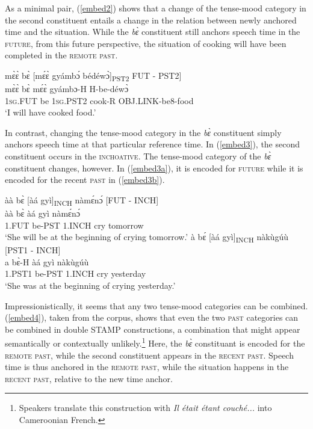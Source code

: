 \noindent As a minimal pair, (\ref{embed2}) shows that a change of the tense-mood category in the second constituent entails a change in the relation between newly anchored time and the situation. While the {\itshape bɛ̀} constituent still anchors speech time in the \textsc{future}, from this future perspective, the situation of cooking will have been completed in the \textsc{remote past}.

\begin{exe} 
\ex\label{embed2}
  \glll mɛ̀ɛ̀ bɛ̀ [mɛ́ɛ̀ gyámbɔ́ bédéwɔ̀]\textsubscript{PST2} \hfill FUT - PST2]\\
        mɛ̀ɛ̀ bɛ̀ mɛ́ɛ̀ gyámbɔ-H H-be-déwɔ̀ \\
        1\textsc{sg}.FUT be 1\textsc{sg}.PST2 cook-R OBJ.LINK-be8-food \\
    \trans `I will have cooked food.'
\end{exe}

In contrast, changing the tense-mood category in the {\itshape bɛ̀} constituent simply anchors speech time at that particular reference time. In (\ref{embed3}), the second constituent occurs in the \textsc{inchoative}. The tense-mood category of the {\itshape bɛ̀} constituent changes, however. In (\ref{embed3a}), it is encoded for \textsc{future} while it is encoded for the recent \textsc{past} in (\ref{embed3b}).

\begin{exe} 
\ex\label{embed3}
\begin{xlist}
\ex\label{embed3a}
  \glll  àà bɛ̀ [àá gyì]\textsubscript{INCH} nàmɛ́nɔ́ \hfill [FUT - INCH]\\
          àà bɛ̀ àá gyì nàmɛ́nɔ́\\
           1.FUT be-PST 1.INCH cry tomorrow     \\
    \trans `She will be at the beginning of crying tomorrow.'
\ex\label{embed3b}
  \glll  à bɛ́ [àá gyì]\textsubscript{INCH} nàkùgúù \hfill [PST1 - INCH]\\
          a bɛ̀-H àá gyì nàkùgúù \\
           1.PST1 be-PST 1.INCH cry yesterday     \\
    \trans `She was at the beginning of crying yesterday.'
\end{xlist}
\end{exe}

 Impressionistically, it seems that any two tense-mood categories can be combined. 
(\ref{embed4}), taken from the corpus, shows that even the two \textsc{past} categories can be combined in double STAMP constructions, a combination that might appear semantically or contextually unlikely.\footnote{Speakers translate this construction with {\itshape Il était étant couché...} into Cameroonian French.}
Here, the {\itshape bɛ̀} constituant is encoded for the \textsc{remote past}, while the second constituent appears in the  \textsc{recent past}. Speech time is thus anchored in the  \textsc{remote past}, while the situation happens in the  \textsc{recent past}, relative to the new time anchor.

